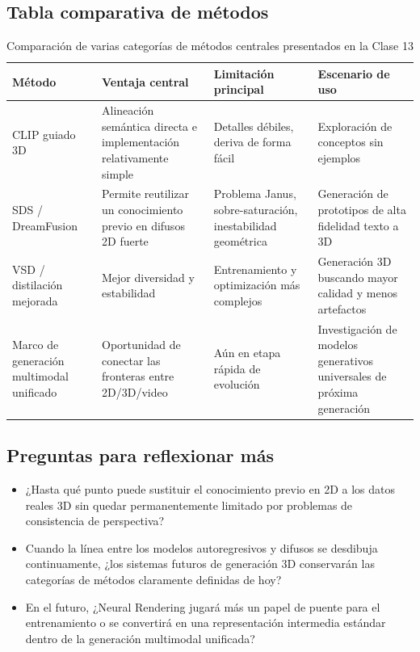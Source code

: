 \subsection{Tabla comparativa de métodos}

\begin{table}[H]
\centering
\begin{tabular}{p{} p{} p{} p{}}
\toprule
Método & Ventaja central & Limitación principal & Escenario de uso \\
\midrule
CLIP guiado 3D & Alineación semántica directa e implementación relativamente simple & Detalles débiles, deriva de forma fácil & Exploración de conceptos sin ejemplos \\
SDS / DreamFusion & Permite reutilizar un conocimiento previo en difusos 2D fuerte & Problema Janus, sobre-saturación, inestabilidad geométrica & Generación de prototipos de alta fidelidad texto a 3D \\
VSD / distilación mejorada & Mejor diversidad y estabilidad & Entrenamiento y optimización más complejos & Generación 3D buscando mayor calidad y menos artefactos \\
Marco de generación multimodal unificado & Oportunidad de conectar las fronteras entre 2D/3D/video & Aún en etapa rápida de evolución & Investigación de modelos generativos universales de próxima generación \\
\bottomrule
\end{tabular}
\caption{Comparación de varias categorías de métodos centrales presentados en la Clase 13}
\end{table}

\subsection{Preguntas para reflexionar más}

\begin{itemize}
    \item ¿Hasta qué punto puede sustituir el conocimiento previo en 2D a los datos reales 3D sin quedar permanentemente limitado por problemas de consistencia de perspectiva?
    \item Cuando la línea entre los modelos autoregresivos y difusos se desdibuja continuamente, ¿los sistemas futuros de generación 3D conservarán las categorías de métodos claramente definidas de hoy?
    \item En el futuro, ¿Neural Rendering jugará más un papel de puente para el entrenamiento o se convertirá en una representación intermedia estándar dentro de la generación multimodal unificada?
\end{itemize}

